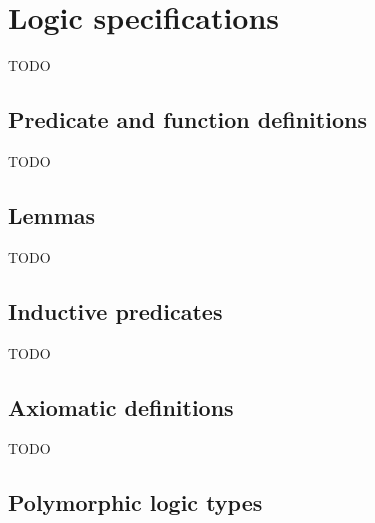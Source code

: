 \section{Logic specifications}
\label{sec:logicspec}

TODO


\subsection{Predicate and function definitions}

TODO


\subsection{Lemmas}

TODO


\subsection{Inductive predicates}
\label{sec:inductivepredicates}

TODO


\subsection{Axiomatic definitions}

TODO


\subsection{Polymorphic logic types}\label{sec:polym-logic-types}

\absent


